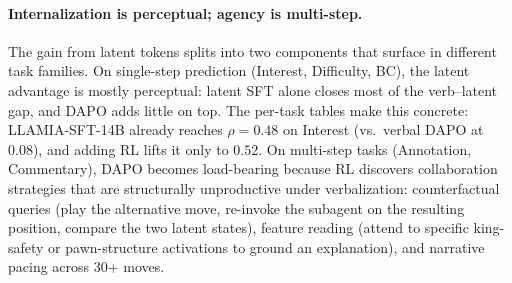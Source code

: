 \paragraph{Internalization is perceptual; agency is multi-step.}
The gain from latent tokens splits into two components that surface in different task families.
On single-step prediction (Interest, Difficulty, BC), the latent advantage is mostly perceptual: latent SFT alone closes most of the verb--latent gap, and DAPO adds little on top.
The per-task tables make this concrete: LLAMIA-SFT-14B already reaches $\rho{=}0.48$ on Interest (vs.\ verbal DAPO at $0.08$), and adding RL lifts it only to $0.52$.
On multi-step tasks (Annotation, Commentary), DAPO becomes load-bearing because RL discovers collaboration strategies that are structurally unproductive under verbalization: counterfactual queries (play the alternative move, re-invoke the subagent on the resulting position, compare the two latent states), feature reading (attend to specific king-safety or pawn-structure activations to ground an explanation), and narrative pacing across 30+ moves.
